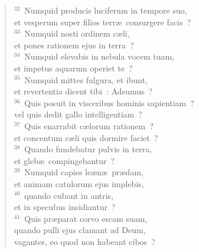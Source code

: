 \begin{flushleft}
\begin{verse}
${}^{32}$~Numquid producis luciferum in tempore suo,\\ et vesperum super filios terr\ae\ consurgere facis~?\\
${}^{33}$~Numquid nosti ordinem c\ae li,\\ et pones rationem ejus in terra~?\\
${}^{34}$~Numquid elevabis in nebula vocem tuam,\\ et impetus aquarum operiet te~?\\
${}^{35}$~Numquid mittes fulgura, et ibunt,\\ et revertentia dicent tibi~: Adsumus~?\\
${}^{36}$~Quis posuit in visceribus hominis sapientiam~?\\ vel quis dedit gallo intelligentiam~?\\
${}^{37}$~Quis enarrabit c\ae lorum rationem~?\\ et concentum c\ae li quis dormire faciet~?\\
${}^{38}$~Quando fundebatur pulvis in terra,\\ et gleb\ae\ compingebantur~?\\
${}^{39}$~Numquid capies le\ae n\ae\ pr\ae dam,\\ et animam catulorum ejus implebis,\\
${}^{40}$~quando cubant in antris,\\ et in specubus insidiantur~?\\
${}^{41}$~Quis pr\ae parat corvo escam suam,\\ quando pulli ejus clamant ad Deum,\\ vagantes, eo quod non habeant cibos~?\end{verse}\end{flushleft}


